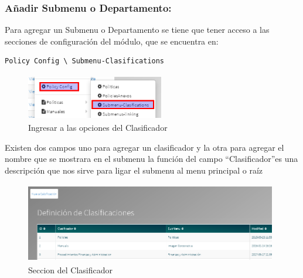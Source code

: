 \documentclass[12pt,letterpaper]{article}
\begin{document}
	\sffamily
	{
	\begin{subsection}{\color{blackgreen}}

	  \subsubsection{A\~nadir Submenu o Departamento:}
    Para agregar un Submenu o Departamento se tiene que tener acceso a las secciones de configuraci\'on del m\'odulo,
    que se encuentra en:
          \begin{lstlisting}[caption=Ruta Clasificador,style=customc]
            Policy Config \ Submenu-Clasifications
    			\end{lstlisting}


                \begin{figure}[htb]
                  \centering
                  \includegraphics[angle=0,width=60mm,height=20mm]{img/Menu_036.png}
                  \caption{Ingresar a las opciones del Clasificador}
                  \label{class}
                \end{figure}

        Existen dos campos uno para agregar un clasificador y la otra para agregar el nombre que se mostrara en el submenu
        la funci\'on del campo \textquotedblleft{Clasificador}\textquotedblright es una descripci\'on que nos sirve para ligar el submenu al menu principal o ra\'iz

               \begin{figure}[htb]
                 \centering
                 \includegraphics[angle=0,width=110mm,height=35mm]{img/Selection_035.png}
                 \caption{Seccion del Clasificador}
                 \label{class}
               \end{figure}


\end{subsection}}
\end{document}
